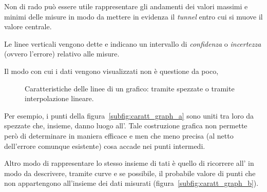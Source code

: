 Non di rado può essere utile rappresentare gli andamenti dei valori massimi e minimi delle misure in modo da mettere in evidenza il \textit{tunnel} entro cui si muove il valore centrale.

Le linee verticali vengono dette  e indicano un intervallo di \textit{confidenza} o \textit{incertezza} (ovvero l'errore) relativo alle misure.

Il modo con cui i dati vengono visualizzati non è questione da poco, 
\begin{figure}[htp]
	\centering
\hfill
	\caption[Caratteristiche delle linee di un grafico.]{Caratteristiche delle linee di un grafico: tramite spezzate o tramite interpolazione lineare.}
	\label{fig:caratt_graph}
\end{figure}

Per esempio, i punti della figura~\ref{subfig:caratt_graph_a} sono uniti tra loro da spezzate che, insieme, danno luogo all'. Tale costruzione grafica non permette però di determinare in maniera efficace e men che meno precisa (al netto dell'errore comunque esistente) cosa accade nei punti intermedi.

Altro modo di rappresentare lo stesso insieme di tati è quello di ricorrere all' in modo da descrivere, tramite curve e se possibile, il probabile valore di punti che non appartengono all'insieme dei dati misurati (figura~\ref{subfig:caratt_graph_b}).




